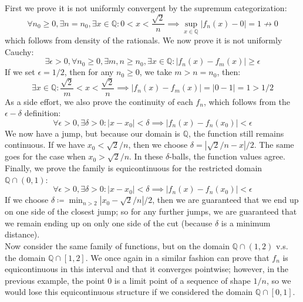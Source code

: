 \documentclass[10pt,letterpaper]{article} %
\begin{document}
First we prove it is not uniformly convergent by the supremum categorization:
\begin{equation*}
  \forall n_0 \geqslant 0, \exists n = n_0, \exists x \in \mathbb{Q}: 0 < x < \frac{\sqrt{2}}{n} \implies \sup_{x \in \mathbb{Q}}|f_n(x) - 0| = 1 \nrightarrow 0
\end{equation*}
which follows from density of the rationals. We now prove it is not uniformly Cauchy:
\begin{equation*}
  \exists \epsilon > 0, \forall n_0 \geqslant 0, \exists m, n \geqslant n_0, \exists x \in \mathbb{Q}: |f_n(x) - f_m(x)| \geqslant \epsilon
\end{equation*}
If we set $\epsilon = 1/2$, then for any $n_0 \geqslant 0$, we take $m > n = n_0$, then:
\begin{equation*}
  \exists x \in \mathbb{Q}: \frac{\sqrt{2}}{m} < x < \frac{\sqrt{2}}{n} \implies |f_n(x) - f_m(x)| = |0 - 1| = 1 > 1/2
\end{equation*}
As a side effort, we also prove the continuity of each $f_n$, which follows from the $\epsilon-\delta$ definition:
\begin{equation*}
  \forall \epsilon > 0, \exists \delta > 0: |x - x_0| < \delta \implies |f_n(x) - f_n(x_0)| < \epsilon
\end{equation*}
We now have a jump, but because our domain is $\mathbb{Q}$, the function still remains continuous. If we have $x_0 < \sqrt{2}/n$, then we choose $\delta = |\sqrt{2}/n - x|/2$. The same goes for the case when $x_0 > \sqrt{2}/n$. In these $\delta$-balls, the function values agree.\\

Finally, we prove the family is equicontinuous for the restricted domain $\mathbb{Q} \cap (0, 1)$:
\begin{equation*}
  \forall \epsilon > 0, \exists \delta > 0: |x-x_0| < \delta \implies |f_n(x) - f_n(x_0)| < \epsilon
\end{equation*}
If we choose $\delta \coloneq \min_{n > 2}|x_0 - \sqrt{2}/n|/2$, then we are guaranteed that we end up on one side of the closest jump; so for any further jumps, we are guaranteed that we remain ending up on only one side of the cut (because $\delta$ is a minimum distance).\\

Now consider the same family of functions, but on the domain $\mathbb{Q} \cap (1, 2)$ v.s. the domain $\mathbb{Q} \cap [1, 2]$. We once again in a similar fashion can prove that $f_n$ is equicontinuous in this interval and that it converges pointwise; however, in the previous example, the point $0$ is a limit point of a sequence of shape $1/n$, so we would lose this equicontinuous structure if we considered the domain $\mathbb{Q} \cap [0, 1]$.\\
\end{document}
